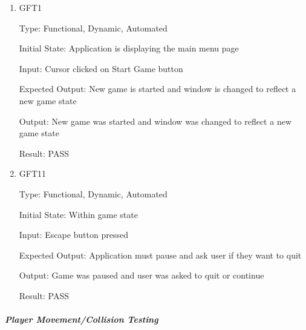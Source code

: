 \documentclass[12pt, titlepage]{article}
\begin{document}
\begin{enumerate}

\item{\label{gft1}{GFT1}\\}

Type: Functional, Dynamic, Automated
					
Initial State: Application is displaying the main menu page
					
Input: Cursor clicked on Start Game button
					
Expected Output: New game is started and window is changed to reflect a new game state

Output: New game was started and window was changed to reflect a new game state

Result: PASS

\setcounter{enumi}{10}
\item{\label{gft11}{GFT11}\\}

Type: Functional, Dynamic, Automated
					
Initial State: Within game state
					
Input: Escape button pressed
					
Expected Output: Application must pause and ask user if they want to quit

Output: Game was paused and user was asked to quit or continue

Result: PASS

\end{enumerate}

\subparagraph{Player Movement/Collision Testing}
\end{document}
